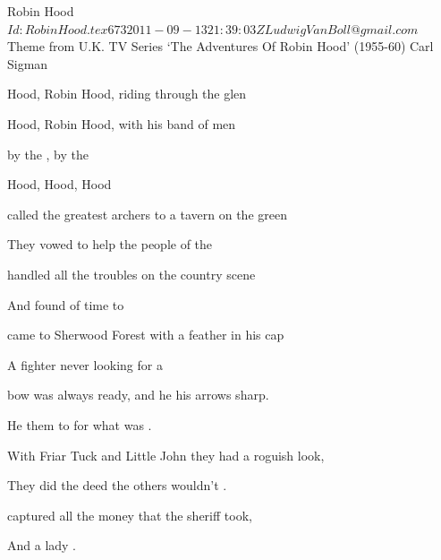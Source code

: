 \begin{SBSong}{Robin Hood}
  {$Id: RobinHood.tex 673 2011-09-13 21:39:03Z LudwigVanBoll@gmail.com $}
  {Theme from U.K. TV Series `The Adventures Of Robin Hood' (1955-60)}
  {Carl Sigman}
  \begin{SBChorus}
      Hood, Robin Hood, riding through the glen
     
      Hood, Robin Hood, with his band of men
     
      by the ,  by the  
     
      Hood,  Hood,  Hood
  \end{SBChorus}
  \begin{SBVerse}
      called the greatest archers to a tavern on the green
     
     They vowed to help the people of the 
     
      handled all the troubles on the  country scene
     
     And  found  of time to 
  \end{SBVerse}
  \begin{SBVerse}
      came to Sherwood Forest with a feather in his cap
     
     A fighter never looking for a 
     
      bow was always ready, and he  his arrows sharp.
     
     He  them to  for what was .
  \end{SBVerse}
  \begin{SBVerse}
     With Friar Tuck and Little John they had a roguish look,
     
     They did the deed the others wouldn't .
     
      captured all the money that the  sheriff took,
     
     And   a lady .
  \end{SBVerse}
\end{SBSong}